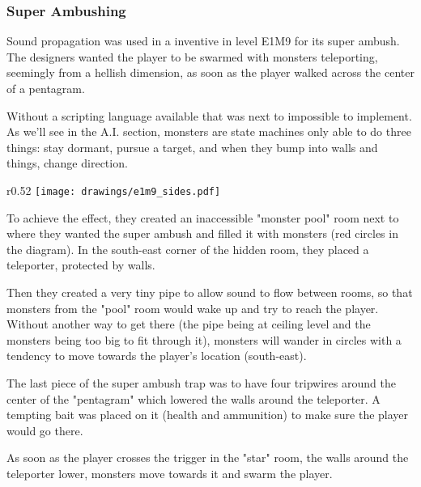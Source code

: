 \subsubsection{Super Ambushing}
Sound propagation was used in a inventive in level E1M9 for its super ambush.  The designers wanted the player to be swarmed with monsters teleporting, seemingly from a hellish dimension, as soon as the player walked across the center of a pentagram.\\
\par
 Without a scripting language available that was next to impossible to implement. As we'll see in the A.I. section, monsters are state machines only able to do three things: stay dormant, pursue a target, and when they bump into walls and things, change direction.\\
\par
\begin{wrapfigure}[24]{r}{0.52\textwidth}
\centering
\texttt{[image: drawings/e1m9\_sides.pdf]}
\end{wrapfigure}

\par

To achieve the effect, they created an inaccessible "monster pool" room next to where they wanted the super ambush and filled it with monsters (red circles in the diagram). In the south-east corner of the hidden room, they placed a teleporter, protected by walls.\\
\par
Then they created a very tiny pipe to allow sound to flow between rooms, so that monsters from the "pool" room would wake up and try to reach the player. Without another way to get there (the pipe being at ceiling level and the monsters being too big to fit through it), monsters will wander in circles with a tendency to move towards the player's location (south-east).\\
\par
The last piece of the super ambush trap was to have four tripwires around the center of the "pentagram" which lowered the walls around the teleporter. A tempting bait was placed on it (health and ammunition) to make sure the player would go there.\\
\par

As soon as the player crosses the trigger in the "star" room, the walls around the teleporter lower, monsters move towards it and swarm the player. \\
\par
{}







